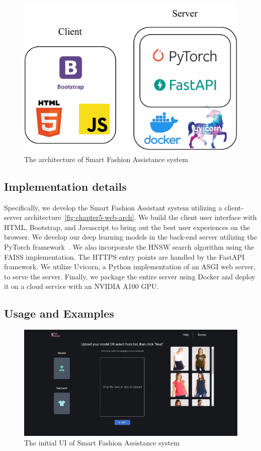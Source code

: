 \begin{figure}[b!]
    \centering
    \includegraphics{content/resources/images/application/chapter5-web-arch.pdf}
    \caption{The architecture of Smart Fashion Assistance system}
    \label{fig:chapter5-web-arch}
\end{figure}

\subsection{Implementation details}
Specifically, we develop the Smart Fashion Assistant system utilizing a client-server architecture~\autoref{fig:chapter5-web-arch}. We build the client user interface with HTML, Bootstrap, and Javascript to bring out the best user experiences on the browser. We develop our deep learning models in the back-end server utilizing the PyTorch framework~\cite{Paszke-NeurIPS2019-Pytorch}. We also incorporate the HNSW search algorithm using the FAISS implementation. The HTTPS entry points are handled by the FastAPI framework. We utilize Uvicorn, a Python implementation of an ASGI web server, to serve the server. Finally, we package the entire server using Docker and deploy it on a cloud service with an NVIDIA A100 GPU.

\subsection{Usage and Examples}
\begin{figure}[h]
  \centering
  \includegraphics[width=\textwidth]{content/resources/images/application/web-step0.png}
  \caption{The initial UI of Smart Fashion Assistance system}
  \label{fig:web-step0}
\end{figure}

